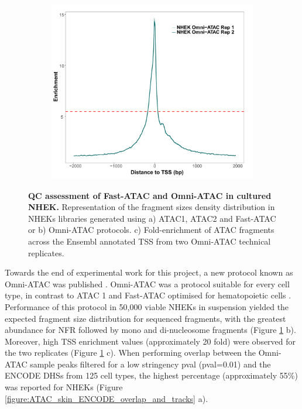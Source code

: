 \begin{figure}[htbp]
\begin{subfigure}{0.48\textwidth}
\end{subfigure}
\begin{subfigure}{0.5\textwidth}
\centering
\includegraphics[width=\textwidth]{./Results1/pdfs/ATAC_skin_TSS_enrichment_NHEK_omni_ATAC}
\caption{\textbf{}} %
\end{subfigure}%
\caption[QC assessment of Fast-ATAC and Omni-ATAC in cultured NHEK]{\textbf{QC assessment of Fast-ATAC and Omni-ATAC in cultured NHEK.
} Representation of the fragment sizes density distribution in NHEKs libraries generated using a) ATAC1, ATAC2 and Fast-ATAC or b) Omni-ATAC protocols. c) Fold-enrichment of ATAC fragments across the Ensembl annotated TSS from two Omni-ATAC technical replicates.}
\label{figure:PS02_skin_ATAC_QC_assessment}
\end{figure} 


Towards the end of experimental work for this project, a new protocol known as Omni-ATAC was published \parencite{Corces2017}. Omni-ATAC was a protocol suitable for every cell type, in contrast to ATAC 1 and Fast-ATAC optimised for hematopoietic cells \parencite{Buenrostro2013,Corces2016}. Performance of this protocol in 50,000 viable NHEKs in suspension yielded the expected fragment size distribution for sequenced fragments, with the greatest abundance for NFR followed by mono and di-nucleosome fragments (Figure \ref{figure:PS02_skin_ATAC_QC_assessment} b). Moreover, high TSS enrichment values (approximately 20 fold) were observed for the two replicates (Figure \ref{figure:PS02_skin_ATAC_QC_assessment} c). When performing overlap between the Omni-ATAC sample peaks filtered for a low stringency pval (pval=0.01) and the ENCODE DHSs from 125 cell types, the highest percentage (approximately 55\%) was reported for NHEKs (Figure \ref{figure:ATAC_skin_ENCODE_overlap_and_tracks} a).

